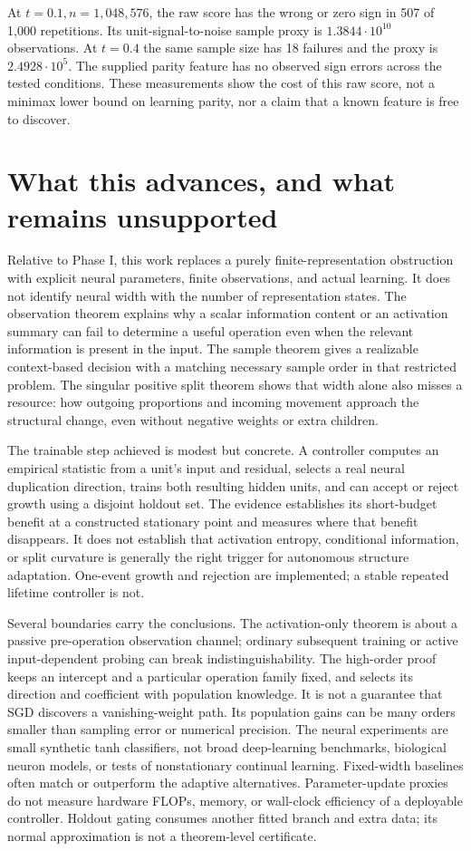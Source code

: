 \documentclass[11pt]{article}
\theoremstyle{remark}\newtheorem{remark}[theorem]{Remark}
\begin{document}
At $t=0.1,n=1{,}048{,}576$, the raw score has the wrong or zero sign in
507 of 1,000 repetitions. Its unit-signal-to-noise sample proxy is
$1.3844\cdot10^{10}$ observations. At $t=0.4$ the same sample size has
18 failures and the proxy is $2.4928\cdot10^5$. The supplied parity feature
has no observed sign errors across the tested conditions. These measurements
show the cost of this raw score, not a minimax lower bound on learning
parity, nor a claim that a known feature is free to discover.



\section{What this advances, and what remains unsupported}
\label{sec:limits}
Relative to Phase I, this work replaces a purely finite-representation
obstruction with explicit neural parameters, finite observations, and
actual learning. It does not identify neural width with the number of
representation states. The observation theorem explains why a scalar
information content or an activation summary can fail to determine a useful
operation even when the relevant information is present in the input.
The sample theorem gives a realizable context-based decision with a
matching necessary sample order in that restricted problem. The singular
positive split theorem shows that width alone also misses a resource:
how outgoing proportions and incoming movement approach the structural
change, even without negative weights or extra children.

The trainable step achieved is modest but concrete. A controller computes
an empirical statistic from a unit's input and residual, selects a real
neural duplication direction, trains both resulting hidden units, and can
accept or reject growth using a disjoint holdout set. The evidence establishes
its short-budget benefit at a constructed stationary point and measures
where that benefit disappears. It does not establish that activation entropy,
conditional information, or split curvature is generally the right trigger
for autonomous structure adaptation. One-event growth and rejection are
implemented; a stable repeated lifetime controller is not.

Several boundaries carry the conclusions. The activation-only theorem is
about a passive pre-operation observation channel; ordinary subsequent
training or active input-dependent probing can break indistinguishability.
The high-order proof keeps an intercept and a particular operation family
fixed, and selects its direction and coefficient with population knowledge.
It is not a guarantee that SGD discovers a vanishing-weight path. Its
population gains can be many orders smaller than sampling error or numerical
precision. The neural experiments are small synthetic tanh classifiers,
not broad deep-learning benchmarks, biological neuron models, or tests of
nonstationary continual learning. Fixed-width baselines often match or
outperform the adaptive alternatives. Parameter-update proxies do not
measure hardware FLOPs, memory, or wall-clock efficiency of a deployable
controller. Holdout gating consumes another fitted branch and extra data;
its normal approximation is not a theorem-level certificate.
\end{document}
